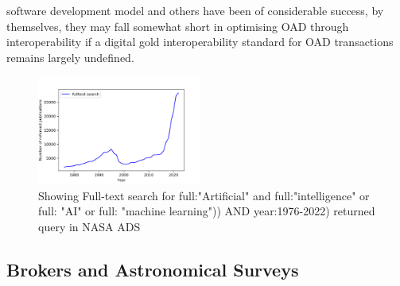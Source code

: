 \documentclass[final,5p,times,twocolumn,authoryear]{elsarticle}
\begin{document}
software development model and others have been of considerable success, by themselves, they may fall somewhat short in optimising OAD through interoperability if a digital gold interoperability standard for OAD transactions remains largely undefined.  
 \begin{figure}
    \centering
    \includegraphics[width=0.48\textwidth]{figs/fulltextai.png}
    \vspace*{-0.4cm}
    \caption{Showing Full-text search for  full:"Artificial" and full:"intelligence" or full: "AI" or full: "machine learning")) AND year:1976-2022) returned query in NASA ADS}
    \label{fig:ai}
\end{figure}


\subsection{ Brokers and Astronomical Surveys}
\end{document}
